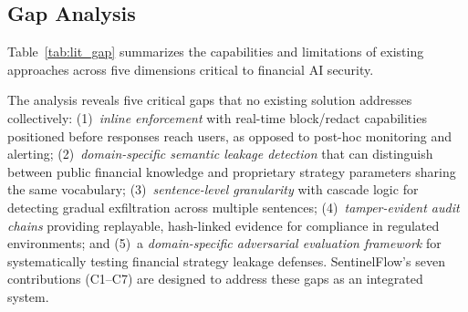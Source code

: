 \documentclass[journal]{IEEEtran}
\begin{document}
\subsection{Gap Analysis}
\label{Sect:LR_Gap}

Table~\ref{tab:lit_gap} summarizes the capabilities and limitations of existing approaches across five dimensions critical to financial AI security.

\begin{table}[!ht]
    \centering
    \caption{Literature Gap Analysis: Existing Approaches vs.\ SentinelFlow Requirements}
    \label{tab:lit_gap}
\end{table}

The analysis reveals five critical gaps that no existing solution addresses collectively: (1)~\textit{inline enforcement} with real-time block/redact capabilities positioned before responses reach users, as opposed to post-hoc monitoring and alerting; (2)~\textit{domain-specific semantic leakage detection} that can distinguish between public financial knowledge and proprietary strategy parameters sharing the same vocabulary; (3)~\textit{sentence-level granularity} with cascade logic for detecting gradual exfiltration across multiple sentences; (4)~\textit{tamper-evident audit chains} providing replayable, hash-linked evidence for compliance in regulated environments; and (5)~a \textit{domain-specific adversarial evaluation framework} for systematically testing financial strategy leakage defenses. SentinelFlow's seven contributions (C1--C7) are designed to address these gaps as an integrated system.
\end{document}
